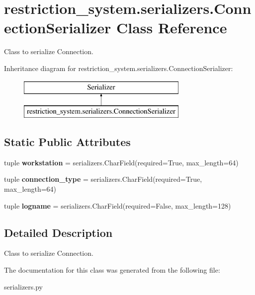 \hypertarget{classrestriction__system_1_1serializers_1_1ConnectionSerializer}{}\section{restriction\+\_\+system.\+serializers.\+Connection\+Serializer Class Reference}
\label{classrestriction__system_1_1serializers_1_1ConnectionSerializer}


Class to serialize Connection.  


Inheritance diagram for restriction\+\_\+system.\+serializers.\+Connection\+Serializer\+:\begin{figure}[H]
\begin{center}
\leavevmode
\includegraphics[height=2.000000cm]{classrestriction__system_1_1serializers_1_1ConnectionSerializer}
\end{center}
\end{figure}
\subsection*{Static Public Attributes}
\begin{DoxyCompactItemize}
\item 
\hypertarget{classrestriction__system_1_1serializers_1_1ConnectionSerializer_a4b7b68cd8dceb28b925063c85fae550a}{}tuple {\bfseries workstation} = serializers.\+Char\+Field(required=True, max\+\_\+length=64)\label{classrestriction__system_1_1serializers_1_1ConnectionSerializer_a4b7b68cd8dceb28b925063c85fae550a}

\item 
\hypertarget{classrestriction__system_1_1serializers_1_1ConnectionSerializer_a87543f57feb29b166a061e6993b27e29}{}tuple {\bfseries connection\+\_\+type} = serializers.\+Char\+Field(required=True, max\+\_\+length=64)\label{classrestriction__system_1_1serializers_1_1ConnectionSerializer_a87543f57feb29b166a061e6993b27e29}

\item 
\hypertarget{classrestriction__system_1_1serializers_1_1ConnectionSerializer_a5bf9db3b379c9c6f254739931f1cf4ca}{}tuple {\bfseries logname} = serializers.\+Char\+Field(required=False, max\+\_\+length=128)\label{classrestriction__system_1_1serializers_1_1ConnectionSerializer_a5bf9db3b379c9c6f254739931f1cf4ca}

\end{DoxyCompactItemize}


\subsection{Detailed Description}
Class to serialize Connection. 

The documentation for this class was generated from the following file\+:\begin{DoxyCompactItemize}
\item 
serializers.\+py\end{DoxyCompactItemize}

